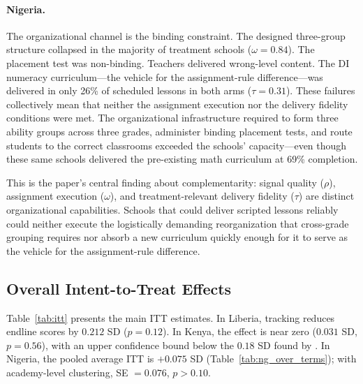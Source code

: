 \documentclass[11pt]{article}
\begin{document}
\paragraph{Nigeria.} The organizational channel is the binding constraint. The designed three-group structure collapsed in the majority of treatment schools ($\omega = 0.84$). The placement test was non-binding. Teachers delivered wrong-level content. The DI numeracy curriculum---the vehicle for the assignment-rule difference---was delivered in only 26\% of scheduled lessons in both arms ($\tau = 0.31$). These failures collectively mean that neither the assignment execution nor the delivery fidelity conditions were met. The organizational infrastructure required to form three ability groups across three grades, administer binding placement tests, and route students to the correct classrooms exceeded the schools' capacity---even though these same schools delivered the pre-existing math curriculum at 69\% completion.

This is the paper's central finding about complementarity: signal quality ($\rho$), assignment execution ($\omega$), and treatment-relevant delivery fidelity ($\tau$) are distinct organizational capabilities. Schools that could deliver scripted lessons reliably could neither execute the logistically demanding reorganization that cross-grade grouping requires nor absorb a new curriculum quickly enough for it to serve as the vehicle for the assignment-rule difference.

\subsection{Overall Intent-to-Treat Effects}

Table~\ref{tab:itt} presents the main ITT estimates. In Liberia, tracking reduces endline scores by $0.212$ SD ($p = 0.12$). In Kenya, the effect is near zero ($0.031$ SD, $p = 0.56$), with an upper confidence bound below the $0.18$ SD found by \citet{duflo2011peer}. In Nigeria, the pooled average ITT is $+0.075$ SD (Table~\ref{tab:ng_over_terms}); with academy-level clustering, SE $= 0.076$, $p > 0.10$.
\end{document}
